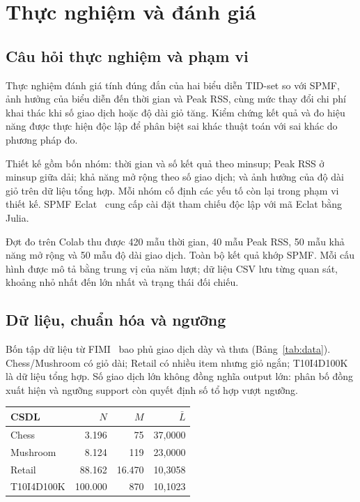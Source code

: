 \section{Thực nghiệm và đánh giá}
\label{sec:benchmark}
\subsection{Câu hỏi thực nghiệm và phạm vi}
Thực nghiệm đánh giá tính đúng đắn của hai biểu diễn TID-set so với
SPMF, ảnh hưởng của biểu diễn đến thời gian và Peak RSS, cùng mức thay
đổi chi phí khai thác khi số giao dịch hoặc độ dài giỏ tăng. Kiểm chứng
kết quả và đo hiệu năng được thực hiện độc lập để phân biệt sai khác
thuật toán với sai khác do phương pháp đo.

Thiết kế gồm bốn nhóm: thời gian và số kết quả theo minsup; Peak RSS ở
minsup giữa dải; khả năng mở rộng theo số giao dịch; và ảnh hưởng của
độ dài giỏ trên dữ liệu tổng hợp. Mỗi nhóm cố định các yếu tố còn lại
trong phạm vi thiết kế. SPMF Eclat~\cite{spmf} cung cấp cài đặt tham
chiếu độc lập với mã Eclat bằng Julia.

Đợt đo trên Colab thu được 420 mẫu thời gian, 40 mẫu Peak RSS, 50 mẫu
khả năng mở rộng và 50 mẫu độ dài giao dịch. Toàn bộ kết quả khớp SPMF.
Mỗi cấu hình được mô tả bằng trung vị của năm lượt; dữ liệu CSV lưu
từng quan sát, khoảng nhỏ nhất đến lớn nhất và trạng thái đối chiếu.

\subsection{Dữ liệu, chuẩn hóa và ngưỡng}
Bốn tập dữ liệu từ FIMI~\cite{fimi} bao phủ giao dịch dày và thưa
(Bảng~\ref{tab:data}). Chess/Mushroom có giỏ dài; Retail có nhiều item
nhưng giỏ ngắn; T10I4D100K là dữ liệu tổng hợp. Số giao dịch lớn không
đồng nghĩa output lớn: phân bố đồng xuất hiện và ngưỡng support còn
quyết định số tổ hợp vượt ngưỡng.

\begin{reporttable}
\caption{Thống kê đầu vào benchmark đã chuẩn hóa; $\bar L$ là độ dài giỏ trung bình.}
\label{tab:data}
\small
\begin{tabular}{lrrr}\toprule
CSDL & $N$ & $M$ & $\bar L$\\\midrule
Chess & 3.196 & 75 & 37,0000\\
Mushroom & 8.124 & 119 & 23,0000\\
Retail & 88.162 & 16.470 & 10,3058\\
T10I4D100K & 100.000 & 870 & 10,1023\\\bottomrule
\end{tabular}
\end{reporttable}

